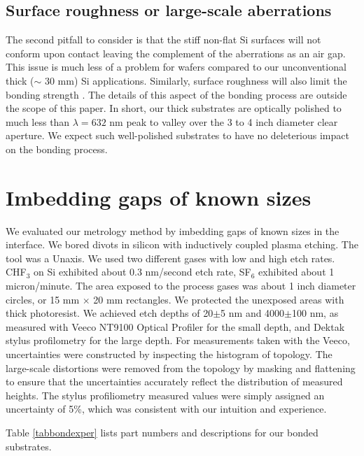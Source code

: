 \documentclass[osajnl,preprint,showpacs,superscriptaddress,12pt]{revtex4-1} %
\begin{document}
\subsection{Surface roughness or large-scale aberrations}
The second pitfall to consider is that the stiff non-flat Si surfaces will not conform upon contact leaving the complement of the aberrations as an air gap. This issue is much less of a problem for wafers compared to our unconventional thick ($\sim$ 30 mm) Si applications.  Similarly, surface roughness will also limit the bonding strength  \cite{JJAP.37.4197,2001JOptA...3...85G}.  The details of this aspect of the bonding process are outside the scope of this paper.  In short, our thick substrates are optically polished to much less than $\lambda = 632$ nm peak to valley over the 3 to 4 inch diameter clear aperture.  We expect such well-polished substrates to have no deleterious impact on the bonding process.  


\section{Imbedding gaps of known sizes}
We evaluated our metrology method by imbedding gaps of known sizes in the interface.  We bored divots in silicon with inductively coupled plasma etching.  The tool was a Unaxis.  We used two different gases with low and high etch rates.  CHF$_3$ on Si exhibited about 0.3 nm/second etch rate, SF$_6$ exhibited about 1 micron/minute.  The area exposed to the process gases was about 1 inch diameter circles, or 15 mm $\times$ 20 mm rectangles.  We protected the unexposed areas with thick photoresist.  We achieved etch depths of 20$\pm$5 nm and 4000$\pm$100 nm, as measured with Veeco NT9100 Optical Profiler for the small depth, and Dektak stylus profilometry for the large depth.  For measurements taken with the Veeco, uncertainties were constructed by inspecting the histogram of topology.  The large-scale distortions were removed from the topology by masking and flattening to ensure that the uncertainties accurately reflect the distribution of measured heights.  The stylus profiliometry measured values were simply assigned an uncertainty of 5\%, which was consistent with our intuition and experience.  

Table \ref{tabbondexper} lists part numbers and descriptions for our bonded substrates.
\end{document}
